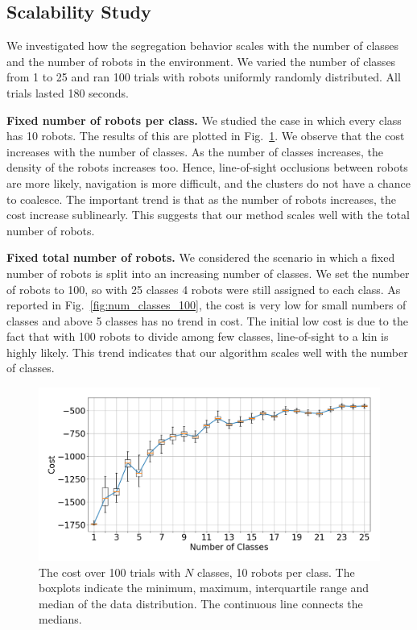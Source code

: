 \documentclass[letterpaper, 10 pt, conference]{ieeeconf}
\newcommand{\myparagraph}[1]{\textbf{#1.}}
\begin{document}
\subsection{Scalability Study} \label{section:scalability}

We investigated how the segregation behavior scales with the number of classes
and the number of robots in the environment. We varied the number of classes
from 1 to 25 and ran 100 trials with robots uniformly randomly distributed. All
trials lasted 180 seconds.

\myparagraph{Fixed number of robots per class}
We studied the case in which every class has 10 robots. The results of this are
plotted in Fig.~\ref{fig:num_classes_10}. We observe that the cost increases
with the number of classes. As the number of classes increases,
the density of the robots increases too. Hence, line-of-sight occlusions between robots are more likely,
navigation is more difficult, and the clusters do not have a chance to coalesce.
The important trend is that as the number of robots increases, the cost increase sublinearly.
This suggests that our method scales well with the total number of robots.

\myparagraph{Fixed total number of robots}
We considered the scenario in which a fixed number of robots is split into an
increasing number of classes. We set the number of robots to 100, so with 25
classes 4 robots were still assigned to each class. As reported in
Fig.~\ref{fig:num_classes_100}, the cost is very low for small numbers of classes
and above 5 classes has no trend in cost. The initial low cost is due to the fact that
with 100 robots to divide among few classes, line-of-sight to a kin is highly likely.
This trend indicates that our algorithm scales well with the number of classes.

\begin{figure}[t]
  \centering
  \includegraphics[width=0.9\linewidth]{./images/num_classes_vs_cost_10_per_class}
  \caption{The cost over 100 trials with $N$ classes, 10 robots per class. The
    boxplots indicate the minimum, maximum, interquartile range and median of
    the data distribution. The continuous line connects the medians.}
  \label{fig:num_classes_10}
\end{figure}
\end{document}
